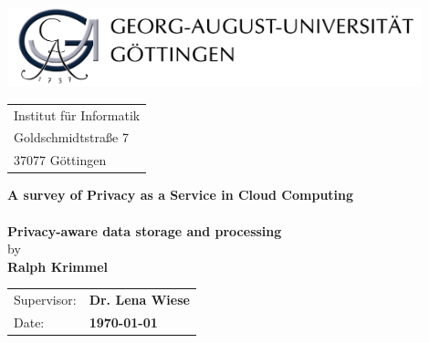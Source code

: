 \documentclass[a4paper,titlepage]{scrartcl}
\begin{document}
\begin{titlepage}

\includegraphics[width=12cm]{logo.jpg}

\vspace{7mm}
\Large

\begin{tabular}[h]{l}
Institut f\"ur Informatik \\
Goldschmidtstraße 7 \\
37077 G\"ottingen \\
\end{tabular}

\begin{center}

\vspace{35mm}
\textbf{\huge{A survey of Privacy as a Service in Cloud Computing \\}}
\vspace{25mm}
\textbf{\Large{ \\
\vspace{4mm}
Privacy-aware data storage and processing \\}}
\vspace{20mm}
by \\
\vspace{20mm}
\textbf{\Large{Ralph Krimmel \\}}
\vspace{15mm}

\end{center}
\vspace{30mm}



\begin{tabular}[h]{l  l}
Supervisor: & \textbf{Dr. Lena Wiese} \\ 
Date: & \textbf{\today} \\
\end{tabular}

\end{titlepage}
\end{document}
